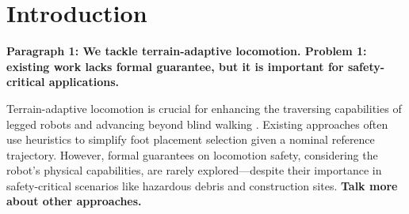 \documentclass[letterpaper, 10 pt, conference]{ieeeconf}
\begin{document}
\section{Introduction}




\textbf{Paragraph 1: We tackle terrain-adaptive locomotion. Problem 1: existing work lacks formal guarantee, but it is important for safety-critical applications.}

Terrain-adaptive locomotion is crucial for enhancing the traversing capabilities of legged robots and advancing beyond blind walking \cite{di2018dynamic,kim2019highly, zhou2022momentum}. Existing approaches often use heuristics \cite{fankhauser2018robust,jenelten2020perceptive,agrawal2022vision,grandia2023perceptive, asselmeier2024hierarchical} to simplify foot placement selection given a nominal reference trajectory. However, formal guarantees on locomotion safety, considering the robot's physical capabilities, are rarely explored—despite their importance in safety-critical scenarios like hazardous debris and construction sites. \textbf{Talk more about other approaches.}
\end{document}
